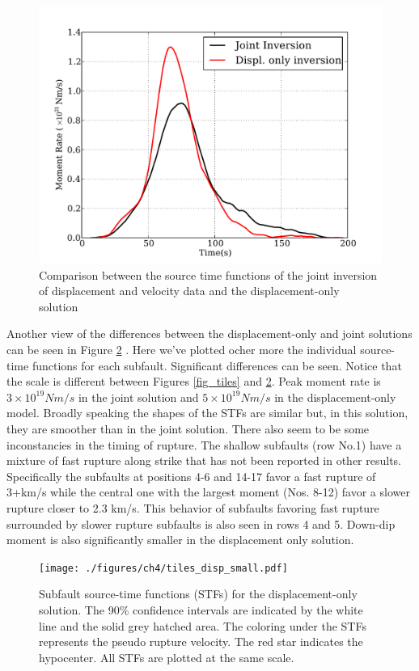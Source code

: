 \begin{figure}[!ht] 
  \centering
  \includegraphics[width=0.72\linewidth]{./figures/ch4/source_TF_compare.pdf}
    \caption[Source time function comparisons]{Comparison between the source time functions of the joint inversion of displacement and velocity data and the displacement-only solution}
  \label{fig_stf_compare}
\end{figure}

Another view of the differences between the displacement-only and joint solutions can be seen in Figure \ref{fig_tiles_disp} . Here we've plotted ocher more the individual source-time functions for each subfault. Significant differences can be seen. Notice that the scale is different between Figures \ref{fig_tiles} and \ref{fig_tiles_disp}. Peak moment rate is $3\times10^{19}Nm/s$ in the joint solution and $5\times10^{19}Nm/s$ in the displacement-only model. Broadly speaking the shapes of the STFs are similar but, in this solution, they are smoother than in the joint solution. There also seem to be some inconstancies in the timing of rupture. The shallow subfaults (row No.1) have a mixture of fast rupture along strike that has not been reported in other results. Specifically the subfaults at positions 4-6 and 14-17 favor a fast rupture of 3+km/s while the central one with the largest moment (Nos. 8-12) favor a slower rupture closer to 2.3 km/s. This behavior of subfaults favoring fast rupture surrounded by slower rupture subfaults is also seen in rows 4 and 5. Down-dip moment is also significantly smaller in the displacement only solution.

\begin{figure}
    \texttt{[image: ./figures/ch4/tiles\_disp\_small.pdf]}
    \caption[Subfault source-time functions]{Subfault source-time functions (STFs) for the displacement-only solution. The 90\% confidence intervals are indicated by the white line and the solid grey hatched area. The coloring under the STFs represents the pseudo rupture velocity. The red star indicates the hypocenter. All STFs are plotted at the same scale.}
    \label{fig_tiles_disp}
\end{figure}

